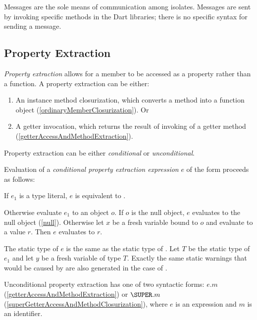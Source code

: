 \documentclass{article}
\begin{document}
\LMHash{}
Messages are the sole means of communication among isolates.
Messages are sent by invoking specific methods in the Dart libraries; there is no specific syntax for sending a message.



\subsection{Property Extraction}

\LMHash{}
{\em Property extraction} allows for a member to be accessed as a property rather than a function.
A property extraction can be either:
\begin{enumerate}
\item An instance method closurization,
which converts a method into a function object
(\ref{ordinaryMemberClosurization}).
Or
\item A getter invocation, which returns the result of invoking of a getter method
(\ref{getterAccessAndMethodExtraction}).
\end{enumerate}


Property extraction can be either {\em conditional} or {\em unconditional}.

\LMHash{}
Evaluation of a {\em conditional property extraction expression} $e$
of the form  proceeds as follows:

\LMHash{}
If $e_1$ is a type literal, $e$ is equivalent to .

\LMHash{}
Otherwise evaluate $e_1$ to an object $o$.
If $o$ is the null object, $e$ evaluates to the null object (\ref{null}).
Otherwise let $x$ be a fresh variable bound to $o$
and evaluate  to a value $r$.
Then $e$ evaluates to $r$.

The static type of $e$ is the same as the static type of .
Let $T$ be the static type of $e_1$ and let $y$ be a fresh variable of type $T$.
Exactly the same static warnings that would be caused by  are also generated in the case of .

\LMHash{}
Unconditional property extraction has one of two syntactic forms: $e.m$ (\ref{getterAccessAndMethodExtraction}) or $\SUPER.m$ (\ref{superGetterAccessAndMethodClosurization}), where $e$ is an expression and $m$ is an identifier.
\end{document}
